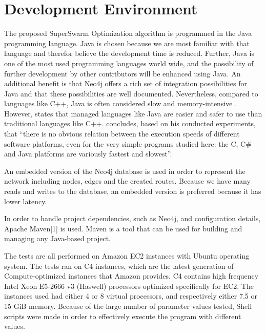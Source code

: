 \section{Development Environment}

The proposed SuperSwarm Optimization algorithm is programmed in the Java programming language. Java is chosen because we are most familiar with that language and therefor believe the development time is reduced. Further, Java is one of the most used programming languages world wide, and the possibility of further development by other contributors will be enhanced using Java. An additional benefit is that Neo4j offers a rich set of integration possibilities for Java and that these possibilities are well documented. Nevertheless, compared to languages like C++, Java is often considered slow and memory-intensive \citep{alnaser12}. However, \citet{sestoft10} states that managed languages like Java are easier and safer to use than traditional languages like C++. \citet{sestoft10} concludes, based on his conducted experiments, that ``there is no obvious relation between the execution speeds of different software platforms, even for the very simple programs studied here: the C, C\# and Java platforms are variously fastest and slowest''.

An embedded version of the Neo4j database is used in order to represent the network including nodes, edges and the created routes. Because we have many reads and writes to the database, an embedded version is preferred because it has lower latency.  

In order to handle project dependencies, such as Neo4j, and configuration details, Apache Maven[1] is used. Maven is a tool that can be used for building and managing any Java-based project. 

The tests are all performed on Amazon EC2 instances with Ubuntu operating system. The tests ran on C4 instances, which are the latest generation of Compute-optimized instances that Amazon provides. C4 contains high frequency Intel Xeon E5-2666 v3 (Haswell) processors optimized specifically for EC2. The instances used had either 4 or 8 virtual processors, and respectively either 7.5 or 15 GiB memory. Because of the large number of parameter values tested, Shell scripts were made in order to effectively execute the program with different values. 




